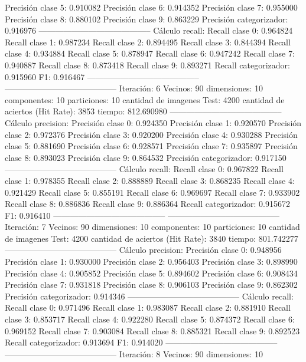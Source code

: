 Precisión clase 5: 0.910082
Precisión clase 6: 0.914352
Precisión clase 7: 0.955000
Precisión clase 8: 0.880102
Precisión clase 9: 0.863229
Precisión categorizador: 0.916976
-----------------------------------------
Cálculo recall: 
Recall clase 0: 0.964824
Recall clase 1: 0.987234
Recall clase 2: 0.894495
Recall clase 3: 0.844394
Recall clase 4: 0.934884
Recall clase 5: 0.878947
Recall clase 6: 0.947242
Recall clase 7: 0.940887
Recall clase 8: 0.873418
Recall clase 9: 0.893271
Recall categorizador: 0.915960
F1: 0.916467
-----------------------------------------
-----------------------------------------
Iteración: 6
Vecinos: 90
dimensiones: 10
componentes: 10
particiones: 10
cantidad de imagenes Test: 4200
cantidad de aciertos (Hit Rate): 3853
tiempo: 812.690980
-----------------------------------------
Cálculo precision: 
Precisión clase 0: 0.924350
Precisión clase 1: 0.920570
Precisión clase 2: 0.972376
Precisión clase 3: 0.920200
Precisión clase 4: 0.930288
Precisión clase 5: 0.881690
Precisión clase 6: 0.928571
Precisión clase 7: 0.935897
Precisión clase 8: 0.893023
Precisión clase 9: 0.864532
Precisión categorizador: 0.917150
-----------------------------------------
Cálculo recall: 
Recall clase 0: 0.967822
Recall clase 1: 0.978355
Recall clase 2: 0.888889
Recall clase 3: 0.868235
Recall clase 4: 0.921429
Recall clase 5: 0.855191
Recall clase 6: 0.969697
Recall clase 7: 0.933902
Recall clase 8: 0.886836
Recall clase 9: 0.886364
Recall categorizador: 0.915672
F1: 0.916410
-----------------------------------------
-----------------------------------------
Iteración: 7
Vecinos: 90
dimensiones: 10
componentes: 10
particiones: 10
cantidad de imagenes Test: 4200
cantidad de aciertos (Hit Rate): 3840
tiempo: 801.742277
-----------------------------------------
Cálculo precision: 
Precisión clase 0: 0.948956
Precisión clase 1: 0.930000
Precisión clase 2: 0.956403
Precisión clase 3: 0.898990
Precisión clase 4: 0.905852
Precisión clase 5: 0.894602
Precisión clase 6: 0.908434
Precisión clase 7: 0.931818
Precisión clase 8: 0.906103
Precisión clase 9: 0.862302
Precisión categorizador: 0.914346
-----------------------------------------
Cálculo recall: 
Recall clase 0: 0.971496
Recall clase 1: 0.983087
Recall clase 2: 0.881910
Recall clase 3: 0.853717
Recall clase 4: 0.922280
Recall clase 5: 0.874372
Recall clase 6: 0.969152
Recall clase 7: 0.903084
Recall clase 8: 0.885321
Recall clase 9: 0.892523
Recall categorizador: 0.913694
F1: 0.914020
-----------------------------------------
-----------------------------------------
Iteración: 8
Vecinos: 90
dimensiones: 10
